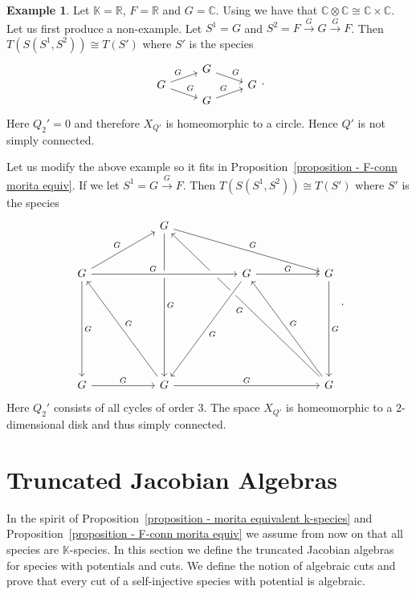 \documentclass[a4paper, reqno]{amsart}
\theoremstyle{definition}
\newtheorem{myex}[mythm]{Example}
\newcommand{\C}{\mathbb{C}}
\newcommand{\K}{\mathbb{K}}
\newcommand{\R}{\mathbb{R}}
\begin{document}
\begin{myex}\label{example - s tilde not simply connected}
	Let $\K = \R$, $F = \R$ and $G = \C$. Using \cite[Lemma 6.12]{soderberg2024mutation} we have that $\C \otimes \C \cong \C \times \C$. Let us first produce a non-example. Let $S^1 = G$ and $S^2 = F \xrightarrow{G}G\xrightarrow{G}F$. Then $T(S(S^1, S^2))\cong T(S')$ where $S'$ is the species
	\begin{equation*}
		\begin{tikzcd}[row sep=0cm]
			& G \arrow[dr, "G"] \\
			G \arrow[ru, "G"] \arrow[dr, "G"] & & G \\
			& G \arrow[ru, "G"]
		\end{tikzcd}.
	\end{equation*}
	Here $Q_2' = 0$ and therefore $X_{Q'}$ is homeomorphic to a circle. Hence $Q'$ is not simply connected.

	Let us modify the above example so it fits in Proposition~\ref{proposition - F-conn morita equiv}. If we let $S^1 = G\xrightarrow{G}F$. Then $T(S(S^1, S^2))\cong T(S')$ where $S'$ is the species
	\begin{equation*}
		\begin{tikzcd}[row sep=1cm, column sep=2cm]
			& G \arrow[rrd, "G"] \arrow[dddd, "G"] \arrow[from = ddddrr, "G"] \\
			G \arrow[ru, "G"] \arrow[ddd, "G"] \arrow[rr, "G\qquad", crossing over] & & G \arrow[r, "G"] \arrow[dddl, "G", crossing over] & G \arrow[ddd, "G"] \\ \\ \\
			G \arrow[r, "G"] & G \arrow[rr, "G"] \arrow[uuul, "G", swap] & & G \arrow[uuul, "G", swap]
		\end{tikzcd}.
	\end{equation*}
	Here $Q_2'$ consists of all cycles of order $3$. The space $X_{Q'}$ is homeomorphic to a $2$-dimensional disk and thus simply connected.
\end{myex}

\section{Truncated Jacobian Algebras}\label{section - truncated jacobian algebras}
In the spirit of Proposition~\ref{proposition - morita equivalent k-species} and Proposition~\ref{proposition - F-conn morita equiv} we assume from now on that all species are $\K$-species. In this section we define the truncated Jacobian algebras for species with potentials and cuts. We define the notion of algebraic cuts and prove that every cut of a self-injective species with potential is algebraic.
\end{document}
